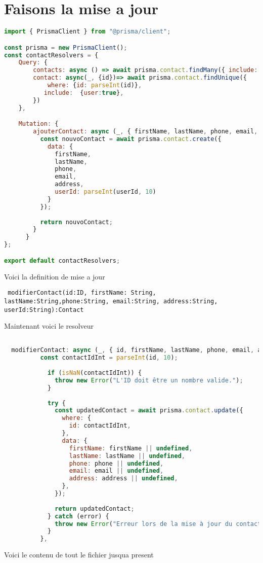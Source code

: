 \documentclass{article}
\begin{document}
\section*{Faisons la mise a jour }
\begin{lstlisting}[language=JavaScript]
import { PrismaClient } from "@prisma/client";

const prisma = new PrismaClient();
const contactResolvers = {
    Query: {
        contacts: async () => await prisma.contact.findMany({ include: { user: true } }),
        contact: async(_, {id})=> await prisma.contact.findUnique({
            where: {id: parseInt(id)},
           include:  {user:true},
        })
    },

    Mutation: {
        ajouterContact: async (_, { firstName, lastName, phone, email, address, userId }) => {
          const nouvoContact = await prisma.contact.create({
            data: {
              firstName,
              lastName,
              phone,
              email,
              address,
              userId: parseInt(userId, 10)
            }
          });
    
          return nouvoContact; 
        }
      }
};

export default contactResolvers;

\end{lstlisting}

Voici la definition de mise a jour
\begin{lstlisting}
 modifierContact(id:ID, firstName: String, lastName:String,phone:String, email:String, address:String, userId:String):Contact

\end{lstlisting}

Maintenant voici le resolveur

\begin{lstlisting}[language=JavaScript]

  modifierContact: async (_, { id, firstName, lastName, phone, email, address }) => {
          const contactIdInt = parseInt(id, 10);
      
            if (isNaN(contactIdInt)) {
              throw new Error("L'ID doit être un nombre valide.");
            }
      
            try {
              const updatedContact = await prisma.contact.update({
                where: {
                  id: contactIdInt, 
                },
                data: {
                  firstName: firstName || undefined,
                  lastName: lastName || undefined,
                  phone: phone || undefined,
                  email: email || undefined,
                  address: address || undefined,
                },
              });
      
              return updatedContact;
            } catch (error) {
              throw new Error("Erreur lors de la mise à jour du contact : " + error.message);
            }
          },
\end{lstlisting}
Voici le contenu de tout le fichier jusqua present 
\end{document}
